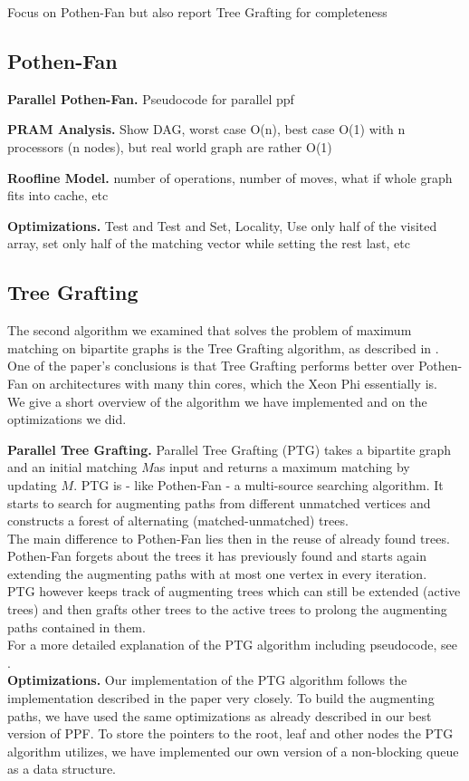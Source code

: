 \documentclass[letterpaper]{article}
\newcommand{\mypar}[1]{{\bf #1.}}
\begin{document}
Focus on Pothen-Fan \cite{Azad:2012} but also report Tree Grafting \cite{Azad:2015} for completeness

\subsection{Pothen-Fan}\label{sec:pf}

\mypar{Parallel Pothen-Fan} 
Pseudocode for parallel ppf

\mypar{PRAM Analysis}
Show DAG, worst case O(n), best case O(1) with n processors (n nodes), but real world graph are rather O(1)

\mypar{Roofline Model}
number of operations, number of moves, what if whole graph fits into cache, etc

\mypar{Optimizations}
Test and Test and Set, Locality, Use only half of the visited array, set only half of the matching vector while setting the rest last, etc

\subsection{Tree Grafting}\label{sec:tg}

The second algorithm we examined that solves the problem of maximum matching on bipartite graphs is the Tree Grafting algorithm, as described in \cite{Azad:2015}. One of the paper's conclusions is that Tree Grafting performs better over Pothen-Fan on architectures with many thin cores, which the Xeon Phi essentially is. \\
We give a short overview of the algorithm we have implemented and on the optimizations we did.

\mypar{Parallel Tree Grafting} 
Parallel Tree Grafting (PTG) takes a bipartite graph and an initial matching $M $as input and returns a maximum matching by updating $M$.
PTG is - like Pothen-Fan - a multi-source searching algorithm. It starts to search for augmenting paths from different unmatched vertices and constructs a forest of alternating (matched-unmatched) trees.\\
The main difference to Pothen-Fan lies then in the reuse of already found trees. Pothen-Fan forgets about the trees it has previously found and starts again extending the augmenting paths with at most one vertex in every iteration. \\
PTG however keeps track of augmenting trees which can still be extended (active trees) and then grafts other trees to the active trees to prolong the augmenting paths contained in them.\\
For a more detailed explanation of the PTG algorithm including pseudocode, see \cite{Azad:2015}.\\
\mypar{Optimizations}
Our implementation of the PTG algorithm follows the implementation described in the paper very closely. To build the augmenting paths, we have used the same optimizations as already described in our best version of  PPF. To store the pointers to the root, leaf and other nodes the PTG algorithm utilizes, we have implemented our own version of a non-blocking queue as a data structure. 
\end{document}
